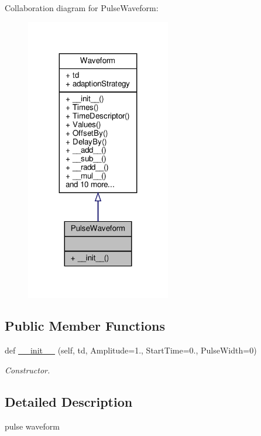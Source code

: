 Collaboration diagram for Pulse\+Waveform\+:
\nopagebreak
\begin{figure}[H]
\begin{center}
\leavevmode
\includegraphics[width=179pt]{classSignalIntegrity_1_1TimeDomain_1_1Waveform_1_1PulseWaveform_1_1PulseWaveform__coll__graph}
\end{center}
\end{figure}
\subsection*{Public Member Functions}
\begin{DoxyCompactItemize}
\item 
def \hyperlink{classSignalIntegrity_1_1TimeDomain_1_1Waveform_1_1PulseWaveform_1_1PulseWaveform_a51a1fd116318537dd687d7af9bc5b8e5}{\+\_\+\+\_\+init\+\_\+\+\_\+} (self, td, Amplitude=1., Start\+Time=0., Pulse\+Width=0)
\begin{DoxyCompactList}\small\item\em Constructor. \end{DoxyCompactList}\end{DoxyCompactItemize}


\subsection{Detailed Description}
pulse waveform 

